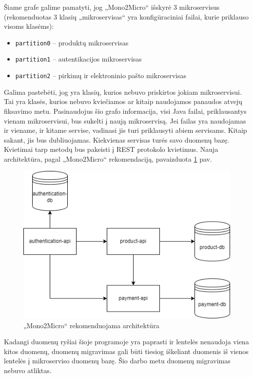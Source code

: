 \documentclass{VUMIFPSbakalaurinis}
\begin{document}
Šiame grafe galime pamatyti, jog „Mono2Micro“ išskyrė 3 mikroservisus (rekomenduotas 3 klasių „mikroservisas“ yra konfigūraciniai failai, kurie priklauso visoms klasėms):
\begin{itemize}
    \item \verb|partition0| -- produktų mikroservisas

    \item \verb|partition1| -- autentikacijos mikroservisas

    \item \verb|partition2| -- pirkimų ir elektroninio pašto mikroservisas
\end{itemize}


Galima pastebėti, jog yra klasių, kurios nebuvo priskirtos jokiam mikroservisui. Tai yra klasės, kurios nebuvo kviečiamos ar kitaip naudojamos panaudos atvejų fiksavimo metu. Pasinaudojus šio grafo informacija, visi Java failai, priklausantys vienam mikroservisui, bus sukelti į naują mikroservisą. Jei failas yra naudojamas ir viename, ir kitame servise, vadinasi jis turi priklausyti abiem servisams. Kitaip sakant, jis bus dubliuojamas. Kiekvienas servisas turės savo duomenų bazę. Kvietimai tarp metodų bus pakeisti į REST protokolo kvietimus. Nauja architektūra, pagal „Mono2Micro“ rekomendaciją, pavaizduota \ref{img:nauja-architektura} pav. 

\begin{figure}[H]
    \centering
    \includegraphics[scale=0.6]{img/microservices-new.png}
    \caption{„Mono2Micro“ rekomenduojama architektūra}
    \label{img:nauja-architektura}
\end{figure}

Kadangi duomenų ryšiai šioje programoje yra paprasti ir lentelės nenaudoja viena kitos duomenų, duomenų migravimas gali būti tiesiog iškeliant duomenis iš vienos lentelės į mikroserviso duomenų bazę. Šio darbo metu duomenų migravimas nebuvo atliktas.
\end{document}
